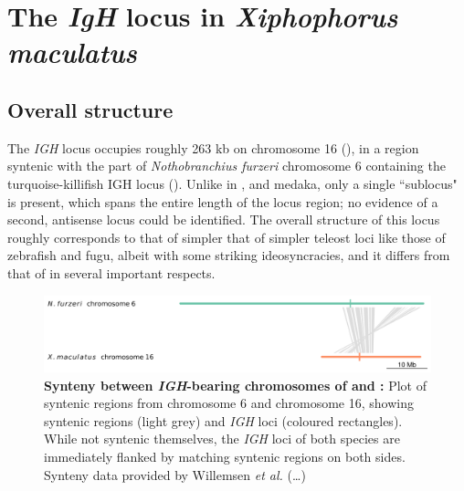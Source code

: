 \section{The \textit{IgH} locus in \textit{Xiphophorus maculatus}}
\label{sec:xma-locus}

	\subsection{Overall structure}
	
	The \Xma \textit{IGH} locus occupies roughly 263 kb on chromosome 16 (), in a region syntenic with the part of \textit{Nothobranchius furzeri} chromosome 6 containing the turquoise-killifish IGH locus ().
	Unlike in \Nfu, and medaka, only a single ``sublocus" is present, which spans the entire length of the locus region; no evidence of a second, antisense locus could be identified. The overall structure of this locus roughly corresponds to that of simpler that of simpler teleost loci like those of zebrafish and fugu, albeit with some striking ideosyncracies, and it differs from that of \Nfu in several important respects.
	
	\begin{figure}
	\centering
	\includegraphics[width=\textwidth]{_Figures/png/nfu-xma-igh-synteny}
	\caption[Synteny between \textit{IGH}-bearing chromosomes of \Nfu and \Xma]{\textbf{Synteny between \textit{IGH}-bearing chromosomes of \Nfu and \Xma:} Plot of syntenic regions from \Nfu chromosome 6 and \Xma chromosome 16, showing syntenic regions (light grey) and \textit{IGH} loci (coloured rectangles). While not syntenic themselves, the \textit{IGH} loci of both species are immediately flanked by matching syntenic regions on both sides. Synteny data provided by Willemsen \textit{et al.} (\dots)} %
	\label{fig:nfu-xma-igh-synteny}
	\end{figure}
	
